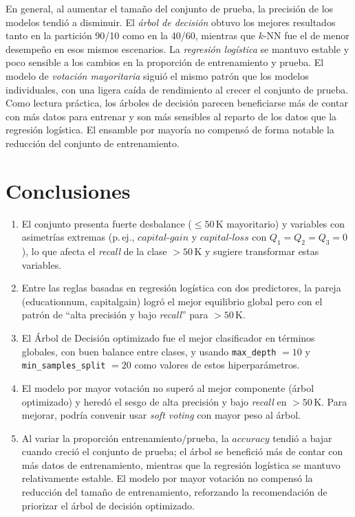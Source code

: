 \documentclass[12pt,a4paper]{article}
\begin{document}
\begin{enumerate}
      En general, al aumentar el tamaño del conjunto de prueba, la precisión de los modelos tendió a disminuir. 
      El \textit{árbol de decisión} obtuvo los mejores resultados tanto en la partición 90/10 como en la 40/60, mientras 
      que \(k\)-NN fue el de menor desempeño en esos mismos escenarios. La \textit{regresión logística} se 
      mantuvo estable y poco sensible a los cambios en la proporción de entrenamiento y prueba. El modelo de 
      \textit{votación mayoritaria} siguió el mismo patrón que los modelos individuales, con una ligera caída de 
      rendimiento al crecer el conjunto de prueba. Como lectura práctica, los árboles de decisión parecen beneficiarse 
      más de contar con más datos para entrenar y son más sensibles al reparto de los datos que la regresión logística. 
      El ensamble por mayoría no compensó de forma notable la reducción del conjunto de entrenamiento. 

\end{enumerate}

\section{Conclusiones}
\begin{enumerate}
  \item El conjunto presenta fuerte desbalance (\(\leq 50\,\text{K}\) mayoritario) y variables con asimetrías 
  extremas (p.\,ej., \( \textit{capital-gain} \) y \( \textit{capital-loss} \) con \(Q_1=Q_2=Q_3=0\)), lo que afecta 
  el \emph{recall} de la clase \(>50\,\text{K}\) y sugiere transformar estas variables. 

  \item Entre las reglas basadas en regresión logística con dos predictores, la pareja (education\-num, 
  capital\-gain) logró el mejor equilibrio global pero con el patrón de “alta precisión y bajo \emph{recall}” 
  para \(>50\,\text{K}\).

  \item El Árbol de Decisión optimizado fue el mejor clasificador en términos globales, con buen balance entre clases, 
  y usando \texttt{max\_depth} \(=10\) y \texttt{min\_samples\_split} \(=20\) como valores de estos hiperparámetros. 

  \item El modelo por mayor votación no superó al mejor componente (árbol optimizado) y heredó el sesgo de alta precisión 
  y bajo \emph{recall} en \(>50\,\text{K}\). Para mejorar, podría convenir usar \emph{soft voting} con mayor peso al árbol.

  \item Al variar la proporción entrenamiento/prueba, la \(\textit{accuracy}\) tendió a bajar cuando creció el conjunto 
  de prueba; el árbol se benefició más de contar con más datos de entrenamiento, mientras que la regresión logística 
  se mantuvo relativamente estable. El modelo por mayor votación no compensó la reducción del tamaño de entrenamiento, reforzando la 
  recomendación de priorizar el árbol de decisión optimizado.
\end{enumerate}
\end{document}
